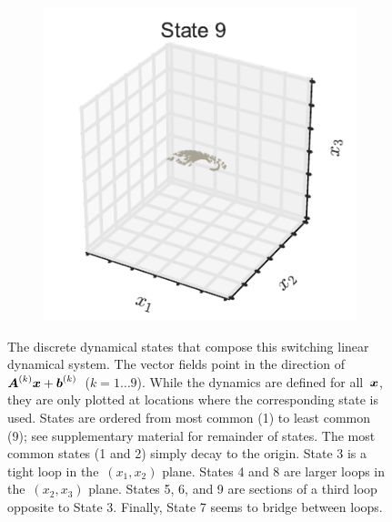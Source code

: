 \documentclass{article}
\begin{document}
\begin{figure}[th!]
\begin{subfigure}[b]{0.32\linewidth}
  \end{subfigure}
  \begin{subfigure}[b]{0.32\linewidth}
    \includegraphics[width=\textwidth]{dynamics_3d_8.pdf}
  \end{subfigure}  
  \caption{The discrete dynamical states that compose this switching
    linear dynamical system. The vector fields point in the direction of
    ~$\boldsymbol{A}^{(k)} \boldsymbol{x} + \boldsymbol{b}^{(k)}$~($k=1 \ldots 9$). While the dynamics are
    defined for all~$\boldsymbol{x}$,
    they are only plotted at locations where the corresponding state is used.
    States are ordered from most common (1)
    to least common (9); see supplementary material for remainder of
    states. The most common states (1 and 2) simply decay to the
    origin. State 3 is a tight loop in the~$(x_1, x_2)$ plane. States
    4 and 8 are larger loops in the~$(x_2, x_3)$ plane. States 5, 6,
    and 9 are sections of a third loop opposite to State 3. Finally,
    State 7 seems to bridge between loops.}
\label{fig:dynamics}
\end{figure}
\end{document}
